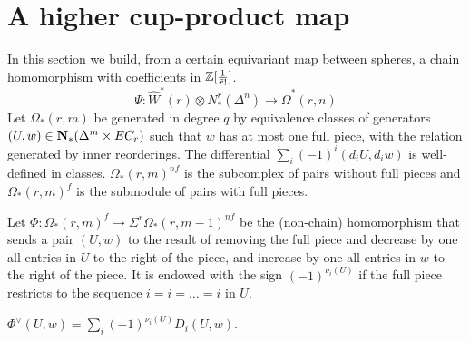 
\section{A higher cup-product map}

In this section we build, from a certain equivariant map between spheres, a chain homomorphism with coefficients in $\mathbb{Z}[\frac{1}{\tilde{r}!}]$.
\[\Psi\colon \hat{W}^*(r)\otimes N^r_*(\Delta^n)\to \bar{\Omega}^*(r,n)\]
Let $\Omega_*(r,m)$ be generated in degree $q$ by equivalence classes of generators $(U,w)\in \mathbf{N}_*(\Delta^m\times EC_r)$ such that $w$ has at most one full piece, with the relation generated by inner reorderings. The differential $\sum_{i} (-1)^i(d_iU,d_iw)$ is well-defined in classes. $\Omega_*(r,m)^{nf}$ is the subcomplex of pairs without full pieces and $\Omega_*(r,m)^{f}$ is the submodule of pairs with full pieces.

Let $\Phi\colon \Omega_*(r,m)^f\to \Sigma^{r}\Omega_{*}(r,m-1)^{nf}$ be the (non-chain) homomorphism that sends a pair $(U,w)$ to the result of removing the full piece and decrease by one all entries in $U$ to the right of the piece, and increase by one all entries in $w$ to the right of the piece. It is endowed with the sign $(-1)^{\nu_i(U)}$ if the full piece restricts to the sequence $i=i=\ldots=i$ in $U$.

\begin{remark}
	 $\Phi^{\vee}(U,w) = \sum_i(-1)^{\nu_i(U)}D_i(U,w)$.
\end{remark}


